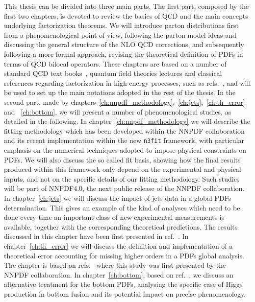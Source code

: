 This thesis can be divided into three main parts. The first part, composed by the first two chapters, 
is devoted to review the basics of QCD and the main concepts underlying factorization theorems. 
We will introduce parton distributions first from a phenomenological point of view, following the parton model ideas and
discussing the general structure of the NLO QCD corrections, and subsequently following a more formal approach,
revising the theoretical definition of PDFs in terms of QCD bilocal operators.
These chapters are based on a number of standard QCD text books~\cite{Ellis:1991qj,Muta:2010xua,Collins:1984xc},
quantum field theories lectures and classical references regarding factorization in high-energy processes,
such as refs.~\cite{Collins:1980ui, Collins:1981uw, Collins:1989gx}, and will be used to set up the 
main notations adopted in the rest of the thesis.
%
In the second part, made by chapters~\ref{ch:nnpdf_methodology},~\ref{ch:jets},~\ref{ch:th_error} and ~\ref{ch:bottom}, 
we will present a number of phenomenological studies, as detailed in the following.
%
In chapter~\ref{ch:nnpdf_methodology} we will describe the fitting methodology which has been developed
within the NNPDF collaboration and its recent implementation within the new {\tt n3fit} framework, 
with particular emphasis on the numerical techniques adopted to impose physical constraints on PDFs.
We will also discuss the so called fit basis, showing how
the final results produced within this framework only depend on the experimental and physical inputs, 
and not on the specific details of our fitting methodology. Such studies will be part of NNPDF4.0, the next public release
of the NNPDF collaboration.
%
In chapter~\ref{ch:jets} we will discuss the impact of jets data in a global PDFs determination. 
This gives an example of the kind of analyses which need to be done
every time an important class of new experimental measurements is available, together with the corresponding
theoretical predictions. 
The results discussed in this chapter have been first presented in ref.~\cite{AbdulKhalek:2020jut}.
In chapter~\ref{ch:th_error} we will discuss the definition and implementation of a theoretical error 
accounting for missing higher orders in a PDFs global analysis. 
The chapter is based on refs.~\cite{AbdulKhalek:2019bux,AbdulKhalek:2019ihb} where this
study was first presented by the NNPDF collaboration.
In chapter~\ref{ch:bottom}, based on ref.~\cite{Forte:2019hjc}, we discuss an alternative treatment for the bottom PDFs,
analysing the specific case of Higgs production in bottom fusion and its potential impact on precise phenomenology. 
